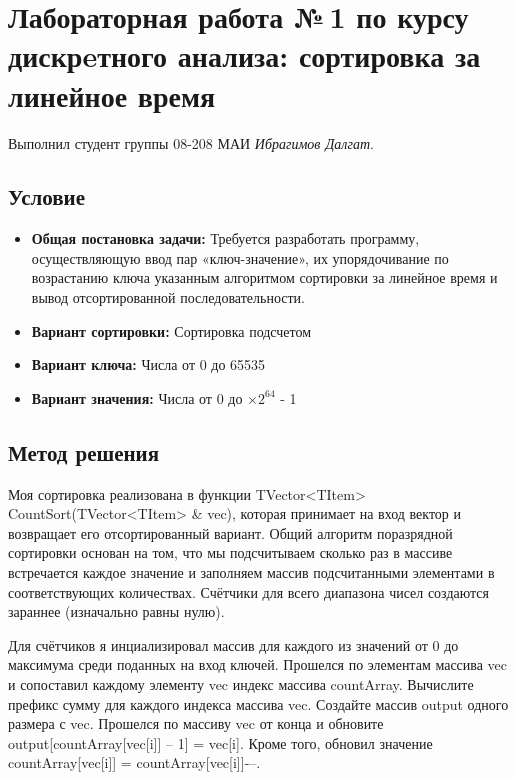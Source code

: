 \documentclass[12pt]{article}
\begin{document}
\section*{Лабораторная работа №\,1 по курсу дискрeтного анализа: сортировка за линейное время}

\noindent Выполнил студент группы 08-208 МАИ \textit{Ибрагимов Далгат}.

\subsection*{Условие}

\begin{itemize}
\item \textbf{Общая постановка задачи:} Требуется разработать программу, осуществляющую ввод пар «ключ-значение», их упорядочивание по возрастанию ключа указанным алгоритмом сортировки за линейное время и вывод отсортированной последовательности.

\item \textbf{Вариант сортировки:} Сортировка подсчетом

\item \textbf{Вариант ключа:} Числа от 0 до 65535

\item \textbf{Вариант значения:} Числа от 0 до $\times 2^{64}$ - 1 
\end{itemize}

\subsection*{Метод решения}

Моя сортировка реализована в функции TVector<TItem> CountSort(TVector<TItem> \& vec), которая принимает на вход вектор и возвращает его отсортированный вариант. Общий алгоритм поразрядной сортировки основан на том, что мы подсчитываем сколько раз в массиве встречается каждое значение и заполняем массив подсчитанными элементами в соответствующих количествах. Счётчики для всего диапазона чисел создаются зараннее (изначально равны нулю).

Для счётчиков я инциализировал массив для каждого из значений от 0 до максимума среди поданных на вход ключей. Прошелся по элементам массива vec и сопоставил каждому элементу vec индекс массива countArray. Вычислите префикс сумму для каждого индекса массива vec. Создайте массив output одного размера с vec. Прошелся по массиву vec от конца и обновите output[countArray[vec[i]] – 1] = vec[i]. Кроме того, обновил значение countArray[vec[i]] = countArray[vec[i]]-–.
\end{document}
